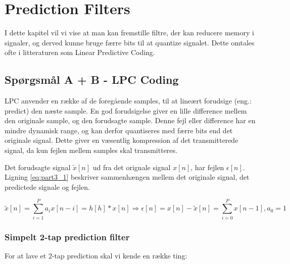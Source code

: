 \chapter{Prediction Filters}
\label{ch:part3}

I dette kapitel vil vi vise at man kan fremstille filtre, der kan reducere memory i signaler, og derved kunne bruge færre bits til at quantize signalet. Dette omtales ofte i litteraturen som Linear Predictive Coding.

\section{Spørgsmål A + B - LPC Coding}

LPC anvender en række af de foregående samples, til at lineært forudsige (eng.: predict) den næste sample. En god forudsigelse giver en lille difference mellem den originale sample, og den forudsagte sample. Denne fejl eller difference har en mindre dynamisk range, og kan derfor quantiseres med færre bits end det originale signal. Dette giver en væsentlig kompression af det transmitterede signal, da kun fejlen mellem samples skal transmitteres.

Det forudsagte signal $\tilde{x}[n]$ ud fra det orignale signal $x[n]$, har fejlen $\epsilon[n]$. Ligning \ref{eq:part3_1} beskriver sammenhængen mellem det originale signal, det predictede signale og fejlen.

\begin{equation}\label{eq:part3_1}
	\tilde{x}[n] = \sum^P_{i=1} a_i x[n-i] = h[h] * x[n] \Rightarrow \epsilon[n] = x[n] - \tilde{x}[n] = \sum^P_{i=0} x[n-1], a_0 = 1
\end{equation}

\subsection{Simpelt 2-tap prediction filter}

For at lave et 2-tap prediction skal vi kende en række ting:

